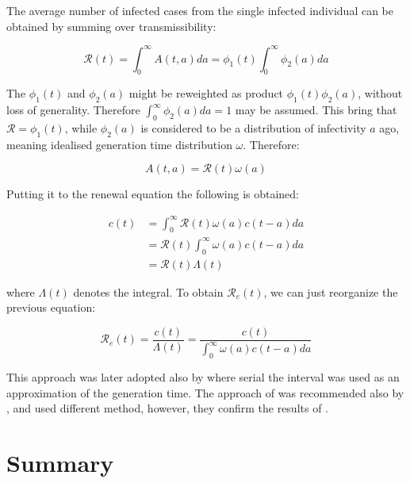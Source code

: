 \documentclass[
  digital, %
  oneside, %
  lof,     %
  lot,     %
]{fithesis4}
\begin{document}
The average number of infected cases from the single infected 
individual can be obtained by summing over transmissibility:

\begin{equation}
  \mathcal{R}(t) = \int^{\infty}_0 A(t, a) da = \phi_1(t) \int^{\infty}_0 \phi_2(a) da
\end{equation}

The $\phi_1(t)$ and $\phi_2(a)$ might be reweighted as 
product $\phi_1(t) \phi_2(a)$, without loss of generality. 
Therefore $\int^{\infty}_0 \phi_2(a) da = 1$ may be assumed. 
This bring that $\mathcal{R} = \phi_1(t)$, while $\phi_2(a)$ 
is considered to be a distribution of infectivity $a$ ago, 
meaning idealised generation time distribution $\omega$. 
Therefore:

\begin{equation}
A(t, a) = \mathcal{R}(t) \omega(a)
\end{equation}

Putting it to the renewal equation the following is obtained:

\begin{equation}
  \begin{split}
    c(t) & = \int^{\infty}_0 \mathcal{R}(t) \omega(a) c(t - a) da \\
    & = \mathcal{R}(t) \int^{\infty}_0 \omega(a) c(t - a) da\\
    & = \mathcal{R}(t) \Lambda(t)    
  \end{split}
\end{equation}

where $\Lambda(t)$ denotes the integral.
To obtain $\mathcal{R}_e(t)$, we can just reorganize the previous equation:

\begin{equation}\label{eq:fraser-Re}
  \mathcal{R}_e(t) = \frac{c(t)}{\Lambda(t)} = \frac{c(t)}{\int^{\infty}_0 \omega(a) c(t - a) da}
\end{equation}

This approach was later adopted also by \cite{cori2013} where serial 
the interval was used as an approximation of the generation time.
The approach of \cite{cori2013} was recommended also by \cite{gostic2020},
and \cite{hasan2020} used different method, however, they confirm the 
results of \cite{cori2013}.


\section{Summary}
\end{document}
